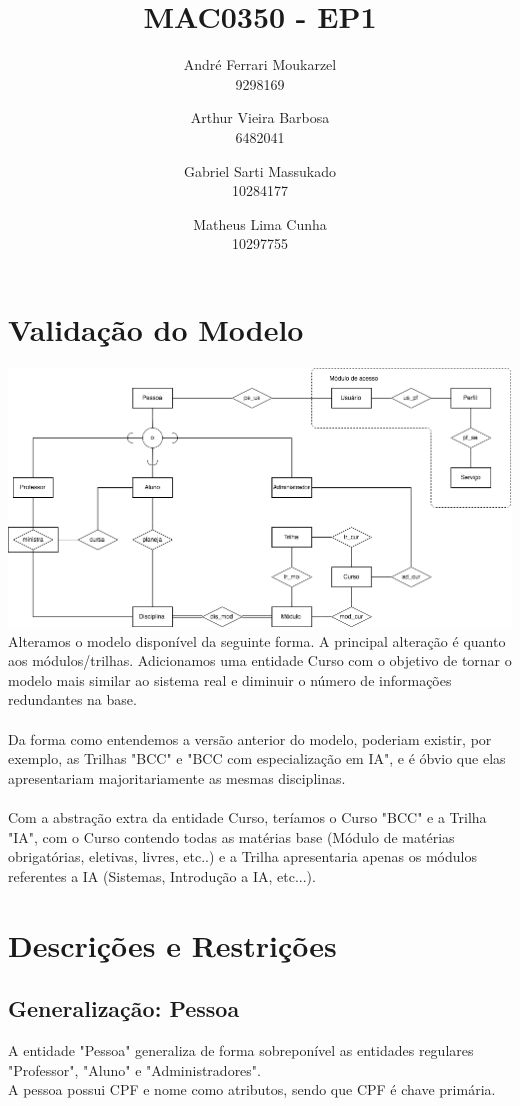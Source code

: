 \documentclass{article}
\title{MAC0350 - EP1}
\date{}
\author{
	André Ferrari Moukarzel \\ 9298169
	\and
	Arthur Vieira Barbosa \\ 6482041
	\and
	Gabriel Sarti Massukado \\ 10284177
	\and
	Matheus Lima Cunha \\ 10297755
}
\begin{document}
  \maketitle
  \newpage
  
  \section{Validação do Modelo}
  
  \includegraphics[width=\textwidth]{MAC350.png}\\
  
  Alteramos o modelo disponível da seguinte forma. A principal alteração é quanto aos módulos/trilhas. Adicionamos uma entidade Curso com o objetivo de tornar o modelo mais similar ao sistema real e diminuir o número de informações redundantes na base. \\
  \\
  Da forma como entendemos a versão anterior do modelo, poderiam existir, por exemplo, as Trilhas "BCC" e "BCC com especialização em IA", e é óbvio que elas apresentariam majoritariamente as mesmas disciplinas. \\
  \\
  Com a abstração extra da entidade Curso, teríamos o Curso "BCC" e a Trilha "IA", com o Curso contendo todas as matérias base (Módulo de matérias obrigatórias, eletivas, livres, etc..) e a Trilha apresentaria apenas os módulos referentes a IA (Sistemas, Introdução a IA, etc...).
  
  \section{Descrições e Restrições}
    \subsection{Generalização: Pessoa}
        \quad A entidade "Pessoa" generaliza de forma sobreponível as entidades regulares "Professor", "Aluno" e "Administradores". \\
        \quad A pessoa possui CPF e nome como atributos, sendo que CPF é chave primária.
\end{document}
